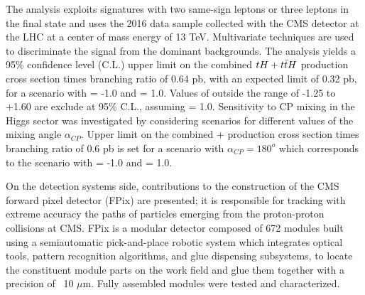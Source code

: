 The analysis exploits signatures with two same-sign leptons or three leptons in the final state and uses the 2016 data sample collected with the CMS detector at the LHC at a center of mass energy of 13 TeV. Multivariate techniques are used to discriminate the signal from the dominant backgrounds. The analysis yields a 95\% confidence level (C.L.) upper limit on the combined ${tH + t\bar{t}H}$ production cross section times branching ratio of 0.64 pb, with an expected limit of 0.32 pb, for a scenario with \Ct = -1.0 and \CV = 1.0. Values of \Ct outside the range of -1.25 to +1.60 are exclude at 95\% C.L., assuming \CV = 1.0. Sensitivity to CP mixing in the Higgs sector was investigated by considering scenarios for different values of the mixing angle $\alpha_{CP}$. Upper limit on the combined \tH + \ttH production cross section times branching ratio of 0.6 pb is set for a scenario with $\alpha_{CP}=180^o$ which corresponds to the scenario with \Ct = -1.0 and \CV = 1.0.

On the detection systems side, contributions to the construction of the CMS forward pixel detector (FPix) are presented; it is responsible for tracking with extreme accuracy the paths of particles emerging from the proton-proton collisions at CMS. FPix is a modular detector composed of 672 modules built using a semiautomatic pick-and-place robotic system which integrates optical tools, pattern recognition algorithms, and glue dispensing subsystems, to locate the constituent module parts on the work field and glue them together with a precision of ~10 $\mu$m. Fully assembled modules were tested and characterized.
